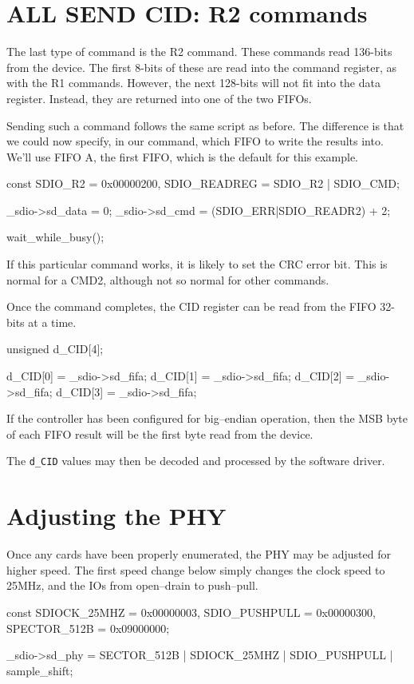 \documentclass{gqtekspec}
\begin{document}
\section{ALL SEND CID: R2 commands}
The last type of command is the R2 command.  These commands read 136-bits
from the device.  The first 8-bits of these are read into the command register,
as with the R1 commands.  However, the next 128-bits will not fit into the
data register.  Instead, they are returned into one of the two FIFOs.

Sending such a command follows the same script as before.  The difference is
that we could now specify, in our command, which FIFO to write the results into.
We'll use FIFO A, the first FIFO, which is the default for this example.

\begin{zCpp}
	const	SDIO_R2      = 0x00000200,
		SDIO_READREG = SDIO_R2 | SDIO_CMD;

	_sdio->sd_data = 0;
	_sdio->sd_cmd = (SDIO_ERR|SDIO_READR2) + 2;

	wait_while_busy();
\end{zCpp}

If this particular command works, it is likely to set the CRC error bit.
This is normal for a CMD2, although not so normal for other commands.

Once the command completes, the CID register can be read from the FIFO
32-bits at a time.

\begin{zCpp}
	unsigned	d_CID[4];

	d_CID[0] = _sdio->sd_fifa;
	d_CID[1] = _sdio->sd_fifa;
	d_CID[2] = _sdio->sd_fifa;
	d_CID[3] = _sdio->sd_fifa;
\end{zCpp}

If the controller has been configured for big--endian operation, then
the MSB byte of each FIFO result will be the first byte read from the
device.

The {\tt d\_CID} values may then be decoded and processed by the software
driver.
\section{Adjusting the PHY}
Once any cards have been properly enumerated, the PHY may be adjusted
for higher speed.  The first speed change below simply changes the clock
speed to 25MHz, and the IOs from open--drain to push--pull.

\begin{zCpp}
	const	SDIOCK_25MHZ  = 0x00000003,
		SDIO_PUSHPULL = 0x00000300,
		SPECTOR_512B  = 0x09000000;

	_sdio->sd_phy = SECTOR_512B | SDIOCK_25MHZ | SDIO_PUSHPULL
			| sample_shift;
\end{zCpp}
\end{document}
